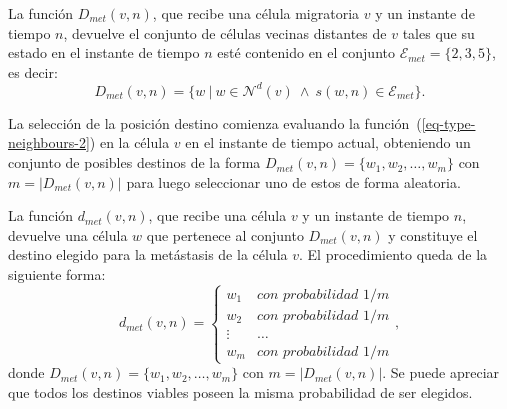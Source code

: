 \begin{definition}
\label{def-type-neighbours-2}
La funci\'on $D_{met}(v,n)$, que recibe una c\'elula migratoria $v$ y un instante de tiempo $n$, devuelve el conjunto de c\'elulas vecinas distantes de $v$ tales que su estado en el instante de tiempo $n$ est\'e contenido en el conjunto $\mathcal{E}_{met}=\lbrace 2,3,5 \rbrace$, es decir:
\begin{equation}
D_{met}(v,n) = \lbrace w~|~w \in \mathcal{N}^d(v)~\wedge~s(w,n) \in \mathcal{E}_{met} \rbrace. \label{eq-type-neighbours-2}
\end{equation}
\end{definition}

La selecci\'on de la posici\'on destino comienza evaluando la funci\'on~(\ref{eq-type-neighbours-2}) en la c\'elula $v$ en el instante de tiempo actual, obteniendo un conjunto de posibles destinos de la forma $D_{met}(v,n) = \lbrace w_1, w_2, \ldots, w_m \rbrace$ con $m={|D_{met}(v,n)|}$ para luego seleccionar uno de estos de forma aleatoria.

\begin{definition}
\label{def-dest-selection-met}
La funci\'on $d_{met}(v,n)$, que recibe una c\'elula $v$ y un instante de tiempo $n$, devuelve una c\'elula $w$ que pertenece al conjunto $D_{met}(v,n)$ y constituye el destino elegido para la met\'astasis de la c\'elula $v$. El procedimiento queda de la siguiente forma:
\begin{equation}
d_{met}(v,n) = \left\lbrace
	\begin{array}{ll}
		w_1 & \textit{con probabilidad } 1/m\\
		w_2 & \textit{con probabilidad } 1/m\\
		\vdots & \ldots\\
		w_m & \textit{con probabilidad } 1/m
	\end{array}
\right., \label{eq-dest-selection-met}
\end{equation}
donde $D_{met}(v,n)= \lbrace w_1,w_2,\ldots,w_m \rbrace$ con $m = |D_{met}(v,n)|$. Se puede apreciar que todos los destinos viables poseen la misma probabilidad de ser elegidos.
\end{definition}

